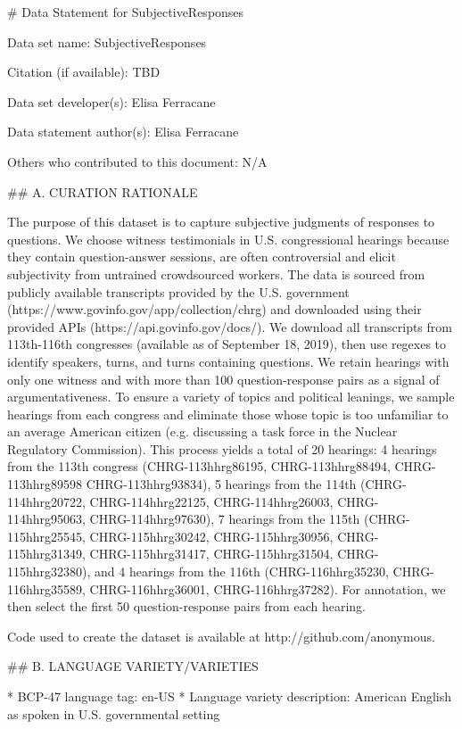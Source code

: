\# Data Statement for SubjectiveResponses

Data set name: SubjectiveResponses

Citation (if available): TBD

Data set developer(s): Elisa Ferracane

Data statement author(s): Elisa Ferracane

Others who contributed to this document: N/A

\#\# A. CURATION RATIONALE 

The purpose of this dataset is to capture subjective judgments of responses to questions. We choose witness testimonials in U.S. congressional hearings because they contain question-answer sessions, are often controversial and elicit subjectivity from untrained crowdsourced workers. The data is sourced from publicly available transcripts provided by the U.S. government (https://www.govinfo.gov/app/collection/chrg) and downloaded using their provided APIs (https://api.govinfo.gov/docs/). We download all transcripts from 113th-116th congresses (available as of September 18, 2019), then use regexes to identify speakers, turns, and turns containing questions. We retain hearings with only one witness and with more than 100 question-response pairs as a signal of argumentativeness. To ensure a variety of topics and political leanings, we sample hearings from each congress and eliminate those whose topic is too unfamiliar to an average American citizen (e.g. discussing a task force in the Nuclear Regulatory Commission). This process yields a total of 20 hearings: 4 hearings from the 113th congress (CHRG-113hhrg86195, CHRG-113hhrg88494, CHRG-113hhrg89598 CHRG-113hhrg93834), 5 hearings from the 114th (CHRG-114hhrg20722, CHRG-114hhrg22125, CHRG-114hhrg26003, CHRG-114hhrg95063, CHRG-114hhrg97630), 7 hearings from the 115th (CHRG-115hhrg25545, CHRG-115hhrg30242, CHRG-115hhrg30956, CHRG-115hhrg31349, CHRG-115hhrg31417, CHRG-115hhrg31504,  CHRG-115hhrg32380), and 4 hearings from the 116th (CHRG-116hhrg35230, CHRG-116hhrg35589, CHRG-116hhrg36001, CHRG-116hhrg37282). For annotation, we then select the first 50 question-response pairs from each hearing.

Code used to create the dataset is available at http://github.com/anonymous.

\#\# B. LANGUAGE VARIETY/VARIETIES

* BCP-47 language tag: en-US
* Language variety description: American English as spoken in U.S. governmental setting

